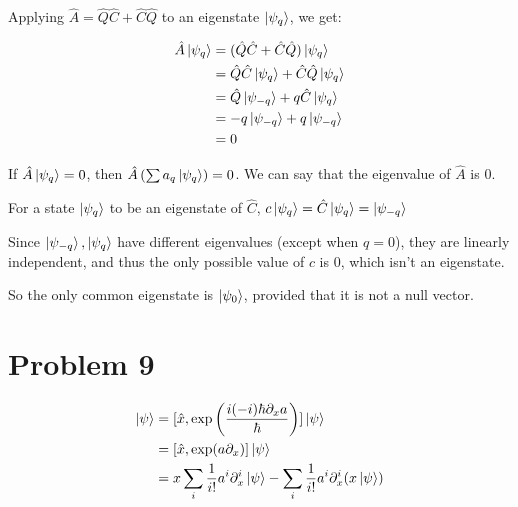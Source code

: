 \documentclass[12pt]{article}
\begin{document}
Applying $\hat{A}=\hat{Q}\hat{C}+\hat{C}\hat{Q}$ to an eigenstate $\Ket{\psi_q}$, we get:

\begin{align*}
\hat{A}\Ket{\psi_q} &=(\hat{Q}\hat{C}+\hat{C}\hat{Q})\Ket{\psi_q}\\
&= \hat{Q}\hat{C}\Ket{\psi_q}+\hat{C}\hat{Q}\Ket{\psi_q} \\
&= \hat{Q}\Ket{\psi_{-q}}+q\hat{C}\Ket{\psi_q}\\
&= -q\Ket{\psi_{-q}}+q\Ket{\psi_{-q}}\\
&=0
\end{align*}

If $\hat A\Ket{\psi_q}=0$, then $\hat A\left(\sum a_q\Ket{\psi_q}\right)=0$. We can say that the eigenvalue of $\hat A$ is 0.

For a state $\Ket{\psi_q}$ to be an eigenstate of $\hat C$, $c\Ket{\psi_q}=\hat C\Ket{\psi_q}=\Ket{\psi_{-q}}$

Since $\Ket{\psi_{-q}},\Ket{\psi_q}$ have different eigenvalues (except when $q=0$), they are linearly independent, and thus the  only possible value of $c$ is 0, which isn't an eigenstate.

So the only common eigenstate is $\Ket{\psi_0}$, provided that it is not a null vector.
\section*{Problem 9}
\newcommand{\kpsi}{\Ket{\psi}}
\begin{align*}
[\hat x, \exp\left(\frac{i\hat p a}{\hbar}\right)]\kpsi &= [\hat x, \exp\left(\frac{i(-i)\hbar\partial_x a}{\hbar}\right)]\kpsi\\
&=[\hat x, \exp(a\partial_x)]\kpsi\\
&=  x \sum_i \frac1{i!}a^i\partial^i_x\kpsi - \sum_i\frac1{i!} a^i\partial^i_x (x\kpsi) 
\end{align*}
\end{document}
